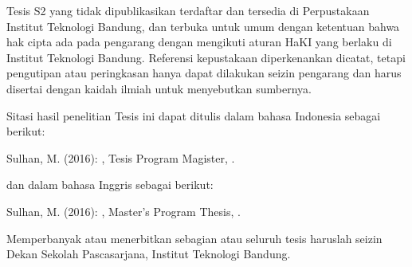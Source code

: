 Tesis S2 yang tidak dipublikasikan terdaftar dan tersedia di Perpustakaan
Institut Teknologi Bandung, dan terbuka untuk umum dengan ketentuan bahwa hak
cipta ada pada pengarang dengan mengikuti aturan HaKI yang berlaku di Institut
Teknologi Bandung.
Referensi kepustakaan diperkenankan dicatat, tetapi pengutipan atau peringkasan
hanya dapat dilakukan seizin pengarang dan harus disertai dengan kaidah ilmiah
untuk menyebutkan sumbernya.

Sitasi hasil penelitian Tesis ini dapat ditulis dalam bahasa Indonesia sebagai
berikut:

\hangindent=1.27cm
Sulhan, M. (2016): \textit{\judul}, Tesis Program Magister, \itb{}.

dan dalam bahasa Inggris sebagai berikut:

\hangindent=1.27cm
Sulhan, M. (2016): \textit{\mytitle}, Master's Program Thesis, \itb{}.

Memperbanyak atau menerbitkan sebagian atau seluruh tesis haruslah seizin Dekan
Sekolah Pascasarjana, Institut Teknologi Bandung.
